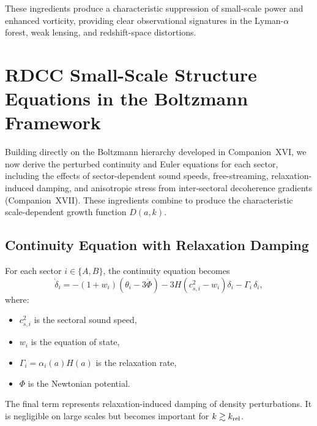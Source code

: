 \documentclass[11pt,a4paper]{article}
\begin{document}
These ingredients produce a characteristic suppression of small-scale power and enhanced
vorticity, providing clear observational signatures in the Lyman-$\alpha$ forest, weak lensing,
and redshift-space distortions.
\section{RDCC Small-Scale Structure Equations in the Boltzmann Framework}

Building directly on the Boltzmann hierarchy developed in Companion~XVI, we now derive
the perturbed continuity and Euler equations for each sector, including the effects of
sector-dependent sound speeds, free-streaming, relaxation-induced damping, and anisotropic
stress from inter-sectoral decoherence gradients (Companion~XVII). These ingredients
combine to produce the characteristic scale-dependent growth function $D(a,k)$.

\subsection{Continuity Equation with Relaxation Damping}

For each sector $i \in \{A,B\}$, the continuity equation becomes
\begin{equation}
\dot{\delta}_i
= -(1+w_i)(\theta_i - 3\dot{\Phi})
- 3H(c_{s,i}^2 - w_i)\delta_i
- \Gamma_i\,\delta_i,
\end{equation}
where:
\begin{itemize}
\item $c_{s,i}^2$ is the sectoral sound speed,
\item $w_i$ is the equation of state,
\item $\Gamma_i = \alpha_i(a)H(a)$ is the relaxation rate,
\item $\Phi$ is the Newtonian potential.
\end{itemize}

The final term represents relaxation-induced damping of density perturbations. It is
negligible on large scales but becomes important for $k \gtrsim k_{\rm rel}$.

\end{document}
